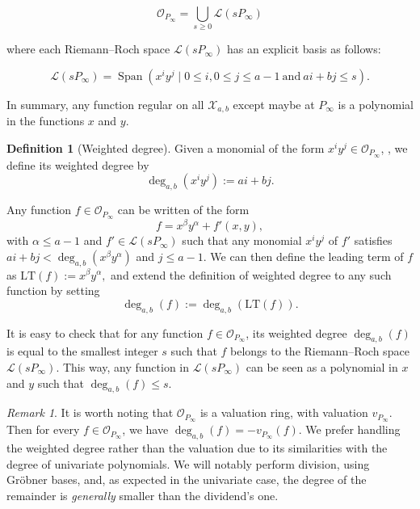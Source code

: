 \documentclass[a4paper]{article}
\theoremstyle{definition}
\newtheorem{definition}[thm]{Definition}
\theoremstyle{remark}
\newtheorem{remark}{Remark}
\newcommand{\calL}{\mathcal{L}}
\newcommand{\calO}{\mathcal{O}}
\newcommand{\calX}{\mathcal{X}}
\newcommand{\Span}[1]{\operatorname{Span}\left(#1\right)}
\newcommand{\degab}[1]{\deg_{a,b}\left(#1\right)}
\begin{document}
\begin{equation}\label{eq:O_Pinf}
\mathcal{O}_{P_\infty}=\bigcup_{s \geq 0} \calL(s P_\infty)
\end{equation}

where each Riemann--Roch space $\calL(s P_\infty)$ has an explicit basis as follows:

\begin{equation} \label{eq:basis_L(sP_inf)}
    \calL(sP_{\infty}) = \Span{x^iy^j \mid 0 \leq i, 0\leq j\leq a-1 \ \mathrm{and} \ ai+bj \leq s}.
\end{equation}

In summary, any function regular on all $\calX_{a,b}$ except maybe at $P_\infty$ is a polynomial in the functions $x$ and $y$. 

\begin{definition}[Weighted degree]
Given a monomial of the form $x^iy^j \in \calO_{P_\infty}$, , we define its weighted degree by
\[ \degab{x^iy^j} := ai+bj.\]

Any function $f \in \calO_{P_\infty}$ can be written of the form $$f = x^{\beta}y^{\alpha} + f'(x,y),$$
with $\alpha \leq a-1$ and $f' \in \calL(sP_{\infty})$ such that any monomial $x^iy^j$ of $f'$ satisfies $ai+bj < \degab{x^{\beta}y^{\alpha}}$ and $j \leq a-1$. We can then define the leading term of $f$ as $\mathrm{LT}(f) := x^{\beta}y^{\alpha},$ and extend the definition of weighted degree to any such function by setting 
\[\degab{f} := \degab{\mathrm{LT}(f)}.\]
\end{definition}

It is easy to check that for any function $f \in \calO_{P_\infty}$, its weighted degree $\degab{f}$ is equal to the smallest integer $s$ such that $f$ belongs to the Riemann--Roch space $\calL(sP_{\infty})$.
%
This way, any function in $\calL(sP_\infty)$ can be seen as a polynomial in $x$ and $y$ such that $\degab{f}\leq s$. 

\begin{remark}
It is worth noting that $\calO_{P_\infty}$ is a valuation ring, with valuation $v_{P_\infty}$. Then for every $f \in \calO_{P_\infty}$, we have $
\degab{f}=-v_{P_\infty}(f)$. We prefer handling the weighted degree rather than the valuation due to its similarities with the degree of univariate 
polynomials. We will notably perform division, using Gr\"obner bases, and, as expected in the univariate case, the degree of the remainder is 
\textit{generally} smaller than the dividend's one.
\end{remark}
\end{document}
